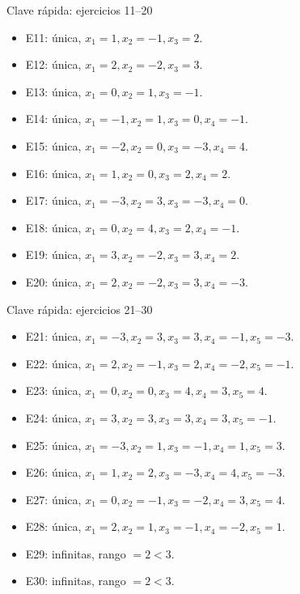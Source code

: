 \documentclass[aspectratio=169,9pt]{beamer}
\theoremstyle{remark}
\begin{document}
\begin{frame}[t]{Clave rápida: ejercicios 11--20}\begin{itemize}
\item E11: única, \(x_{1}=1, x_{2}=-1, x_{3}=2\).
\item E12: única, \(x_{1}=2, x_{2}=-2, x_{3}=3\).
\item E13: única, \(x_{1}=0, x_{2}=1, x_{3}=-1\).
\item E14: única, \(x_{1}=-1, x_{2}=1, x_{3}=0, x_{4}=-1\).
\item E15: única, \(x_{1}=-2, x_{2}=0, x_{3}=-3, x_{4}=4\).
\item E16: única, \(x_{1}=1, x_{2}=0, x_{3}=2, x_{4}=2\).
\item E17: única, \(x_{1}=-3, x_{2}=3, x_{3}=-3, x_{4}=0\).
\item E18: única, \(x_{1}=0, x_{2}=4, x_{3}=2, x_{4}=-1\).
\item E19: única, \(x_{1}=3, x_{2}=-2, x_{3}=3, x_{4}=2\).
\item E20: única, \(x_{1}=2, x_{2}=-2, x_{3}=3, x_{4}=-3\).
\end{itemize}\end{frame}
\begin{frame}[t]{Clave rápida: ejercicios 21--30}\begin{itemize}
\item E21: única, \(x_{1}=-3, x_{2}=3, x_{3}=3, x_{4}=-1, x_{5}=-3\).
\item E22: única, \(x_{1}=2, x_{2}=-1, x_{3}=2, x_{4}=-2, x_{5}=-1\).
\item E23: única, \(x_{1}=0, x_{2}=0, x_{3}=4, x_{4}=3, x_{5}=4\).
\item E24: única, \(x_{1}=3, x_{2}=3, x_{3}=3, x_{4}=3, x_{5}=-1\).
\item E25: única, \(x_{1}=-3, x_{2}=1, x_{3}=-1, x_{4}=1, x_{5}=3\).
\item E26: única, \(x_{1}=1, x_{2}=2, x_{3}=-3, x_{4}=4, x_{5}=-3\).
\item E27: única, \(x_{1}=0, x_{2}=-1, x_{3}=-2, x_{4}=3, x_{5}=4\).
\item E28: única, \(x_{1}=2, x_{2}=1, x_{3}=-1, x_{4}=-2, x_{5}=1\).
\item E29: infinitas, rango \(=2<3\).
\item E30: infinitas, rango \(=2<3\).
\end{itemize}\end{frame}
\end{document}
